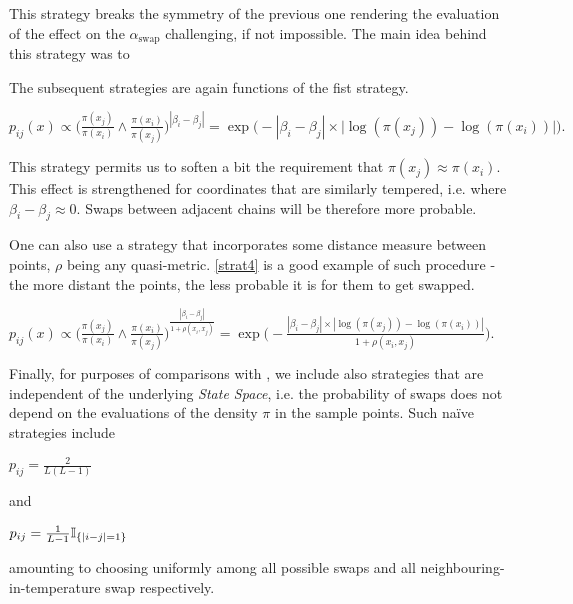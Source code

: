 This strategy breaks the symmetry of the previous one rendering the evaluation of the effect on the $\alpha_\text{swap}$ challenging, if not impossible. The main idea behind this strategy was to  


The subsequent strategies are again functions of the fist strategy.

\begin{strategy}[resume]
	\item 
		$p_{ij}(x) \propto 
			\Big( \frac{\pi (x_j)}{\pi( x_i )} \wedge 
			\frac{\pi (	x_i)}{\pi( x_j )} \Big)^{|\beta_i - \beta_j|} = 
		\exp \Big( - |\beta_i - \beta_j| \times \big| \log ( \pi(x_j) ) - \log ( \pi(x_i) ) \big| \Big).$\label{strat3} 
\end{strategy}

This strategy permits us to soften a bit the requirement that $\pi(x_j) \approx \pi (x_i)$. This effect is strengthened for coordinates that are similarly tempered, i.e. where $\beta_i - \beta_j \approx 0$. Swaps between adjacent chains will be therefore more probable. 

One can also use a strategy that incorporates some distance measure between points, $\rho$ being any quasi-metric. \ref{strat4} is a good example of such procedure - the more distant the points, the less probable it is for them to get swapped.  

\begin{strategy}[resume]
	\item 
		$p_{ij}(x) \propto \Big( \frac{\pi (x_j)}{\pi( x_i )} \wedge \frac{\pi (x_i)}{\pi( x_j )} \Big)^\frac{|\beta_i - \beta_j|}{1 + \rho(x_i, x_j)} = \exp \Big( - \frac{|\beta_i - \beta_j| \times | \log ( \pi(x_j) ) - \log ( \pi(x_i) ) |}{{1 + \rho(x_i, x_j)}} \Big).$\label{strat4}
\end{strategy} 

Finally, for purposes of comparisons with \cite{BaragattiParallelTemperingWithEquiEnergyMoves}, we include also strategies that are independent of the underlying {\it State Space}, i.e. the probability of swaps does not depend on the evaluations of the density $\pi$ in the sample points. Such na\"ive strategies include 

\begin{strategy}[resume]
	\item $p_{ij} = \frac{2}{L (L - 1)}$\label{strat5}
\end{strategy}

and 

\begin{strategy}[resume]
	\item $p_{ij} = \frac{1}{L - 1} \mathbb{I}_{ \{|i-j|=1\} }$\label{strat6}
\end{strategy}

amounting to choosing uniformly among all possible swaps and all neighbouring-in-temperature swap respectively. 